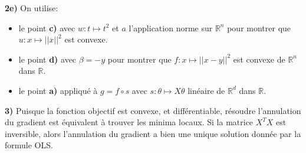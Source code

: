 \documentclass[
10pt, %
a4paper, %
oneside, %
headinclude,footinclude, %
BCOR5mm, %
]{scrartcl}
\begin{document}
\textbf{2e)} On utilise:
\begin{itemize}
    \item le point \textbf{c)} avec $w: t\mapsto t^2$ et $a$ l'application
        norme sur $\mathbb{R}^n$ pour montrer que $u:x\mapsto ||x||^2$ est convexe.
    \item le point \textbf{d)} avec $\beta=-y$ pour montrer que $f:x\mapsto ||x-y||^2$ est convexe de $\mathbb{R}^n$ dans $\mathbb{R}$.
    \item le point \textbf{a)} appliqué à $g=f\circ s$ avec $s:\theta \mapsto X\theta$ linéaire de $ \mathbb{R}^d$ dans $\mathbb{R}$.
\end{itemize}

\textbf{3)} Puisque la fonction objectif est convexe, et différentiable, résoudre l'annulation du gradient est équivalent à trouver les minima locaux. Si la matrice $X^TX$ est inversible, alors l'annulation du gradient a bien une unique solution donnée par la formule OLS.
\end{document}
